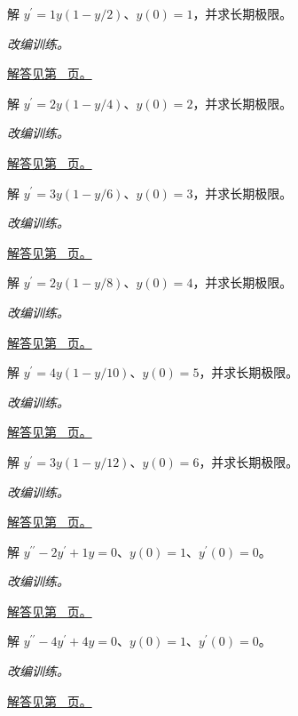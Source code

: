 \documentclass[UTF8,12pt,a4paper,fontset=fandol]{ctexart}
\begin{document}
\begin{example}\label{ex:c23q7}
解 $y^{\prime}=1y(1-y/2)$、$y(0)=1$，并求长期极限。
\par\textit{改编训练。}\par\hyperref[ans:c23q7]{解答见第~\pageref{ans:c23q7} 页。}
\end{example}
\begin{example}\label{ex:c23q8}
解 $y^{\prime}=2y(1-y/4)$、$y(0)=2$，并求长期极限。
\par\textit{改编训练。}\par\hyperref[ans:c23q8]{解答见第~\pageref{ans:c23q8} 页。}
\end{example}
\begin{example}\label{ex:c23q9}
解 $y^{\prime}=3y(1-y/6)$、$y(0)=3$，并求长期极限。
\par\textit{改编训练。}\par\hyperref[ans:c23q9]{解答见第~\pageref{ans:c23q9} 页。}
\end{example}
\begin{example}\label{ex:c23q10}
解 $y^{\prime}=2y(1-y/8)$、$y(0)=4$，并求长期极限。
\par\textit{改编训练。}\par\hyperref[ans:c23q10]{解答见第~\pageref{ans:c23q10} 页。}
\end{example}
\begin{example}\label{ex:c23q11}
解 $y^{\prime}=4y(1-y/10)$、$y(0)=5$，并求长期极限。
\par\textit{改编训练。}\par\hyperref[ans:c23q11]{解答见第~\pageref{ans:c23q11} 页。}
\end{example}
\begin{example}\label{ex:c23q12}
解 $y^{\prime}=3y(1-y/12)$、$y(0)=6$，并求长期极限。
\par\textit{改编训练。}\par\hyperref[ans:c23q12]{解答见第~\pageref{ans:c23q12} 页。}
\end{example}
\begin{example}[重复特征根]\label{ex:c23q13}
解 $y^{\prime\prime}-2y^{\prime}+1y=0$、$y(0)=1$、$y^{\prime}(0)=0$。
\par\textit{改编训练。}\par\hyperref[ans:c23q13]{解答见第~\pageref{ans:c23q13} 页。}
\end{example}
\begin{example}[重复特征根]\label{ex:c23q14}
解 $y^{\prime\prime}-4y^{\prime}+4y=0$、$y(0)=1$、$y^{\prime}(0)=0$。
\par\textit{改编训练。}\par\hyperref[ans:c23q14]{解答见第~\pageref{ans:c23q14} 页。}
\end{example}
\end{document}
